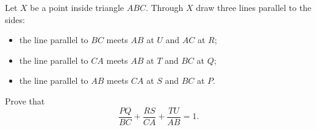 Let $X$ be a point inside triangle $ABC$. Through $X$ draw three lines parallel to the sides:
\begin{itemize}
\item the line parallel to $BC$ meets $AB$ at $U$ and $AC$ at $R$;
\item the line parallel to $CA$ meets $AB$ at $T$ and $BC$ at $Q$;
\item the line parallel to $AB$ meets $CA$ at $S$ and $BC$ at $P$.
\end{itemize}
Prove that
\[\dfrac{PQ}{BC}+\dfrac{RS}{CA}+\dfrac{TU}{AB}=1.\]

